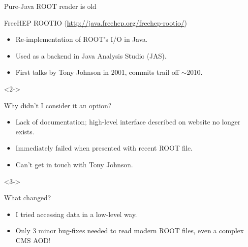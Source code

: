 \documentclass{beamer}
\begin{document}
\begin{frame}{Pure-Java ROOT reader is old}
\vspace{0.35 cm}
\begin{block}{FreeHEP ROOTIO \scriptsize (\textcolor{blue}{\url{http://java.freehep.org/freehep-rootio/}})}
\vspace{-0.1 cm}
\begin{itemize}
\item Re-implementation of ROOT's I/O in Java.
\item Used as a backend in Java Analysis Studio (JAS).
\item First talks by Tony Johnson in 2001, commits trail off $\sim$2010.
\end{itemize}
\end{block}

\vspace{-0.25 cm}
\begin{uncoverenv}<2->
\begin{block}{Why didn't I consider it an option?}
\vspace{-0.1 cm}
\begin{itemize}
\item Lack of documentation; high-level interface described on website no longer exists.
\item Immediately failed when presented with recent ROOT file.
\item Can't get in touch with Tony Johnson.
\end{itemize}
\end{block}
\end{uncoverenv}

\vspace{-0.25 cm}
\begin{uncoverenv}<3->
\begin{block}{What changed?}
\vspace{-0.1 cm}
\begin{itemize}
\item I tried accessing data in a low-level way.
\item Only 3 minor bug-fixes needed to read modern ROOT files, even a complex CMS AOD!
\end{itemize}
\end{block}
\end{uncoverenv}
\end{frame}
\end{document}
